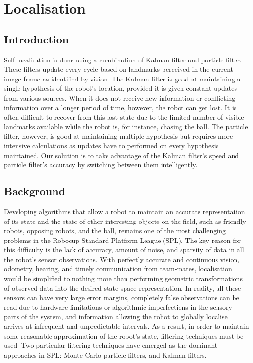 \documentclass[pdftex,11pt,a4paper]{report}
\begin{document}
\newpage
\chapter{Localisation}\label{sectionLocalisation}

\section{Introduction}
Self-localisation is done using a combination of Kalman filter and particle filter. These filters update every cycle based on landmarks perceived in the current image frame as identified by vision. The Kalman filter is good at maintaining a single hypothesis of the robot's location, provided it is given constant updates from various sources. When it does not receive new information or conflicting information over a longer period of time, however, the robot can get lost. It is often difficult to recover from this lost state due to the limited number of visible landmarks available while the robot is, for instance, chasing the ball. The particle filter, however, is good at maintaining multiple hypothesis but requires more intensive calculations as updates have to performed on every hypothesis maintained. Our solution is to take advantage of the Kalman filter's speed and particle filter's accuracy by switching between them intelligently.

\section{Background} 

Developing algorithms that allow a robot to maintain an accurate representation of its state and the state of other interesting objects on the field, such as friendly robots, opposing robots, and the ball, remains one of the most challenging problems in the Robocup Standard Platform League (SPL). The key reason for this difficulty is the lack of accuracy, amount of noise, and sparsity of data in all the robot's sensor observations. With perfectly accurate and continuous vision, odometry, hearing, and timely communication from team-mates, localisation would be simplified to nothing more than performing geometric transformations of observed data into the desired state-space representation. In reality, all these sensors can have very large error margins, completely false observations can be read due to hardware limitations or algorithmic imperfections in the sensory parts of the system, and information allowing the robot to globally localise arrives at infrequent and unpredictable intervals. As a result, in order to maintain some reasonable approximation of the robot's state, filtering techniques must be used. Two particular filtering techniques have emerged as the dominant approaches in SPL: Monte Carlo particle filters, and Kalman filters.
\end{document}
